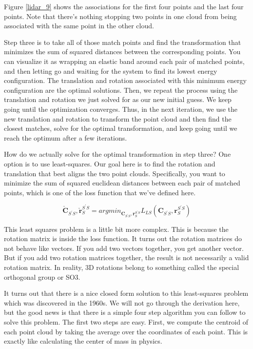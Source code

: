 Figure \ref{lidar_9} shows
the associations for the first four points and
the last four points. Note that there's nothing
stopping two points in one cloud from being
associated with the same point in
the other cloud. 

Step three is to take all of those match points and find
the transformation that minimizes the sum of squared distances between
the corresponding points. You can visualize
it as wrapping an elastic band around
each pair of matched points, and then letting go and
waiting for the system to find its lowest
energy configuration. The translation and
rotation associated with this minimum energy configuration are the optimal solutions. Then, we repeat the process
using the translation and rotation we just solved for
as our new initial guess. We keep going until
the optimization converges. Thus, in the next iteration, we use the new translation
and rotation to transform the point cloud and then
find the closest matches, solve for the optimal
transformation, and keep going until we reach the optimum after a few iterations. 


How do we actually solve for the optimal transformation
in step three? One option is to use least-squares. Our goal here is to
find the rotation and translation that best aligns
the two point clouds. Specifically, you want
to minimize the sum of squared euclidean
distances between each pair of matched points, which is one of the loss function that we've defined here. 


\begin{equation}
{\check{\mathbf{C}}_{S^{'}S}, \check{\mathbf{r}}_{S}^{S^{'}S}} = argmin_{\mathbf{C}_{S^{'}S}, \mathbf{r}_{S}^{S^{'}S}} L_{LS}(\mathbf{C}_{S^{'}S}, \mathbf{r}_{S}^{S^{'}S}) 
\end{equation}

This least squares problem
is a little bit more complex. This is because
the rotation matrix is inside the loss function. It turns out the
rotation matrices do not behave like vectors. If you add two vectors together, you get another vector. But if you add two
rotation matrices together, the result is not necessarily
a valid rotation matrix. In reality, 3D rotations
belong to something called the special orthogonal group or SO3. 

It turns out that there is a nice closed form solution to this least-squares
problem which was discovered in the 1960s. We will not  go through
the derivation here, but the good news
is that there is a simple four step algorithm you can follow to
solve this problem. The first two steps are easy. First, we compute the centroid of each point cloud by taking the average over
the coordinates of each point. This is exactly like calculating the center of mass in physics. 

